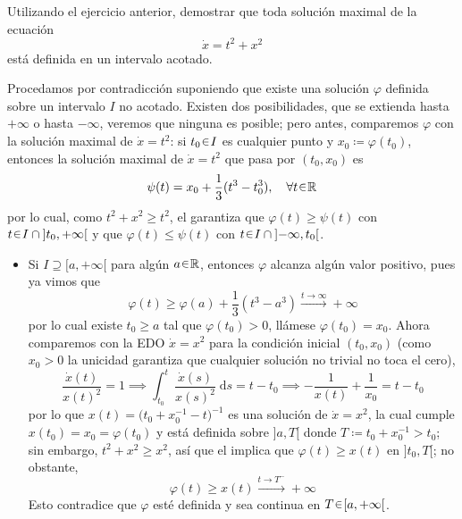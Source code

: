 \begin{ejer}
Utilizando el ejercicio anterior, demostrar que toda solución maximal
de la ecuación
\[
    \dot{x} = t^2 + x^2
\]
está definida en un intervalo acotado.
\end{ejer}
\begin{sol}[Demostración]
Procedamos por contradicción suponiendo que existe una solución $\varphi$ definida sobre un intervalo $I$ no acotado. Existen dos posibilidades, que se extienda hasta $+\infty$ o hasta $-\infty$, veremos que ninguna es posible; pero antes, comparemos $\varphi$ con la solución maximal de $\dot{x} = t^2$: si $t_0 \en I$ es cualquier punto y $x_0 \coloneq \varphi(t_0)$, entonces la solución maximal de $\dot{x} = t^2$ que pasa por $(t_0, x_0)$ es
\[
    \psi(t) = x_0 + \frac13(t^3 - t_0^3), \quad \forall t \en \mathbb{R}
\]
por lo cual, como $t^2 + x^2 \geq t^2$, el  garantiza que $\varphi(t) \geq \psi(t)$ con $t \en I \cap {]t_0, +\infty[}$ y que $\varphi(t) \leq \psi(t)$ con $t \en I \cap {]{-\infty}, t_0[}$.
    \begin{itemize}
    \item Si $I \supseteq {[a, +\infty[}$ para algún $a \en \mathbb{R}$, entonces $\varphi$ alcanza algún valor positivo, pues ya vimos que 
    \[
        \varphi(t) \geq \varphi(a) + \frac13(t^3 - a^3) \xrightarrow{t \to \infty} +\infty
    \]
    por lo cual existe $t_0 \geq a$ tal que $\varphi(t_0) > 0$, llámese $\varphi(t_0) = x_0$. Ahora comparemos con la EDO $\dot{x} = x^2$ para la condición inicial $(t_0,x_0)$ (como $x_0 > 0$ la unicidad garantiza que cualquier solución no trivial no toca el cero), 
    \[
        \frac{\dot{x}(t)}{x(t)^2} = 1%
        \implies \int^t_{t_0}\frac{\dot{x}(s)}{x(s)^2}\;\mathrm{d}s = t - t_0%
        \implies -\frac{1}{x(t)} + \frac{1}{x_0} = t - t_0
    \]
    por lo que $x(t) = \big(t_0 + x_0^{-1} - t\big)^{-1}$ es una solución de $\dot{x} = x^2$, la cual cumple $x(t_0) = x_0 = \varphi(t_0)$ y está definida sobre ${]a, T[}$ donde $T \coloneq t_0 + x_0^{-1} > t_0$; sin embargo, $t^2 + x^2 \geq x^2$, así que el  implica que $\varphi(t) \geq x(t)$ en ${]t_0, T[}$; no obstante, 
    \[
        \varphi(t) \geq x(t) \xrightarrow{t\to T^-} +\infty
    \]
    Esto contradice que $\varphi$ esté definida y sea continua en $T \en [a, +\infty[$.


\end{itemize}
\end{sol}

